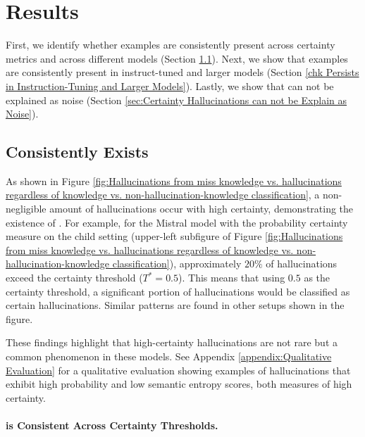 

\section{Results}\label{sec:main_results}

First, we identify whether \chk examples are consistently present across certainty metrics and across different models (Section \ref{sec:Consistently Exists}). Next, we show that \chk examples are consistently present in instruct-tuned and larger models (Section \ref{chk Persists in Instruction-Tuning and Larger Models}). Lastly, we show that \chk can not be explained as noise (Section \ref{sec:Certainty Hallucinations can not be Explain as Noise}).



\subsection{\chk Consistently Exists}\label{sec:Consistently Exists}

As shown in Figure \ref{fig:Hallucinations from miss knowledge vs. hallucinations regardless of knowledge vs. non-hallucination-knowledge classification}, 
a non-negligible amount of hallucinations occur with high certainty, demonstrating the existence of \chk. For example, for the Mistral model with the probability certainty measure on the child setting (upper-left subfigure of Figure \ref{fig:Hallucinations from miss knowledge vs. hallucinations regardless of knowledge vs. non-hallucination-knowledge classification}), approximately $20\%$ of hallucinations exceed the certainty threshold ($T^* = 0.5$).  
 This means that using $0.5$ as the certainty threshold, a significant portion of hallucinations would be classified as certain hallucinations.
 Similar patterns are found in other setups shown in the figure. 
 
 These findings highlight that high-certainty hallucinations are not rare but a common phenomenon in these models.
See Appendix \ref{appendix:Qualitative Evaluation} for a qualitative evaluation showing examples of hallucinations that exhibit high probability and low semantic entropy scores, both measures of high certainty.



\paragraph{\chk is Consistent Across Certainty Thresholds.}

